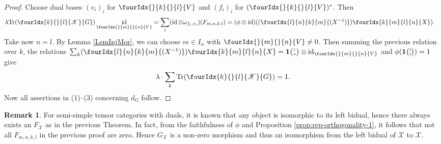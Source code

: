 \documentclass[10pt]{article}
\DeclareMathOperator{\id}{id}
\newcommand{\dual}[1]{#1^{*}}
\newcommand{\Tr}{\mathrm{Tr}}
\newcommand{\Grt}[3]{#1{\tiny {\begin{pmatrix} #2\\#3\end{pmatrix}}}}
\newcommand{\UnitC}[2]{\Grt{\mathbf{1}}{#1}{#2}}
\newcommand{\Gr}[5]{\fourIdx{#2}{#4}{#3}{#5}{#1}}%
\newcommand{\Gru}[3]{\Gr{#1}{}{}{#2}{#3}}
\theoremstyle{definition}
\newtheorem{Rem}[Theorem]{Remark}
\numberwithin{equation}{section}
\begin{document}
\begin{proof}
  Choose dual  bases
  $(v_{i})_{i}$ for $\Gru{V}{k}{l}$ and $(f_{i})_{i}$ for  $\dual{(\Gru{V}{k}{l})}$. Then
  \begin{align*}
    \lambda   \Tr( \Gr{G}{k}{l}{}{\mathscr{X}}) \id_{\Gru{V}{m}{n}}
 &= \sum_{i} (\id \otimes
    \omega_{f_{i},v_{i}})(F_{m,n,k,l}) = (\phi \otimes
    \id)((\Gr{(X^{-1})}{l}{k}{n}{m}) \Gr{X}{k}{l}{m}{n}).
  \end{align*}
  Take now $n=l$.  By Lemma \ref{LemInjMor}, we can choose $m\in I_{\alpha}$ with $\Gru{V}{m}{n}\neq 0$.   Then summing the previous relation over $k$, the relations $\sum_{k}
  (\Gr{(X^{-1})}{l}{k}{n}{m}) \Gr{X}{k}{l}{m}{n} = \UnitC{l}{n}
  \otimes \id_{\Gru{V}{m}{n}}$ and
  $\phi(\UnitC{l}{l})=1$ give
\begin{align*}
\lambda \cdot  \sum_{k} \Tr(\Gr{G}{k}{l}{}{\mathscr{X}}) = 1.  
\end{align*}
Now all assertions in (1)--(3) concerning $d_G$ follow.
\end{proof}

\begin{Rem} For semi-simple tensor categories with duals, it is known that any object is isomorphic to its left bidual, hence there always exists an $F_{\mathscr{X}}$ as in the previous Theorem. In fact, from the faithfulness of $\phi$ and Proposition \ref{prop:rep-orthogonality-1}, it follows that not all $F_{m,n,k,l}$ in the previous proof are zero. Hence $G_{\mathscr{X}}$ is a non-zero morphism and thus an isomorphism from the left bidual of $\mathscr{X}$ to $\mathscr{X}$.  
\end{Rem}
\end{document}
